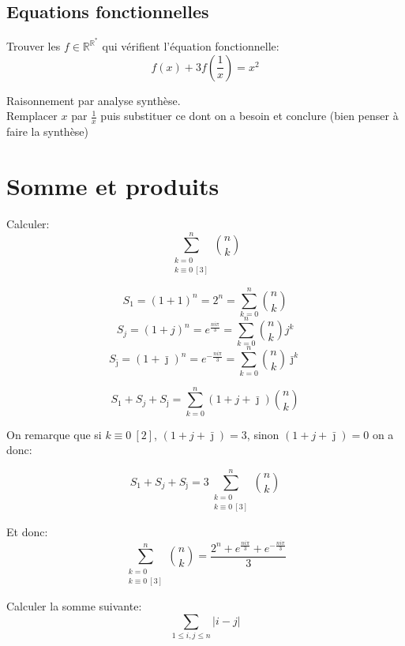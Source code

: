 \documentclass{article}
\newcommand{\R}{\mathbb{R}}
\begin{document}
\subsection{Equations fonctionnelles}
\begin{exercise}
  Trouver les $f\in\R^{\R^*}$ qui vérifient l'équation fonctionnelle:
  \[f(x)+3f\left(\frac 1 x\right) = x^2\]
\end{exercise}
\begin{solution}
  Raisonnement par analyse synthèse.\\
  Remplacer $x$ par $\frac 1 x$ puis substituer ce dont on a besoin et conclure (bien penser à faire la synthèse)

\end{solution}
\section{Somme et produits}
\begin{exercise}

  Calculer:
  \[\sum_{\substack{k=0\\k\equiv0 \ [3]}}^n \binom{n}{k}\]
\end{exercise}

\begin{solution}
  \[S_1 = {(1+1)}^n = 2^n = \sum_{k=0}^n\binom{n}{k}\]
  \[S_j = {(1+j)}^n = e^{\frac{ni\pi}{3}} = \sum_{k=0}^n\binom{n}{k} j^k\]
  \[S_{\bar{\jmath}} = {(1+\bar{\jmath})}^n = e^{-\frac{ni\pi}{3}} = \sum_{k=0}^n\binom{n}{k} \bar{\jmath}^k\]

  \[S_1+S_j+S_{\bar{\jmath}} = \sum_{k=0}^n(1+j+\bar{\jmath})\binom{n}{k}\]

  On remarque que si $k\equiv 0 \ [2]$, $ (1+j+\bar{\jmath}) = 3$, sinon $ (1+j+\bar{\jmath}) = 0$
  on a donc:

  \[S_1+S_j+S_{\bar{\jmath}} = 3\sum_{\substack{k=0\\k\equiv0 \ [3]}}^n \binom{n}{k}\]

  Et donc:
  \[\sum_{\substack{k=0\\k\equiv0 \ [3]}}^n \binom{n}{k} = \frac{2^n+e^{\frac{ni\pi}{3}}+e^{-\frac{ni\pi}{3}}}{3}\]

\end{solution}

\begin{exercise}

  Calculer la somme suivante: \[\sum_{1\leq i,j\leq n} \lvert i - j \rvert\]
\end{exercise}
\end{document}
